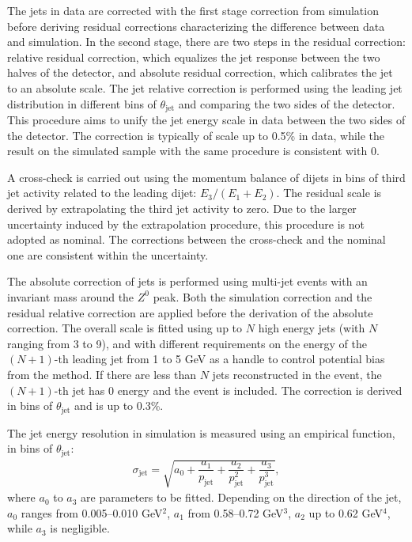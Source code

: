 \documentclass[aps,preprint,superscriptaddress,groupedaddress]{revtex4}  %
\begin{document}
The jets in data are corrected with the first stage correction from simulation before deriving residual corrections characterizing the difference between data and simulation.  In the second stage, there are two steps in the residual correction: relative residual correction, which equalizes the jet response between the two halves of the detector, and absolute residual correction, which calibrates the jet to an absolute scale. The jet relative correction is performed using the leading jet distribution in different bins of $\theta_\text{jet}$ and comparing the two sides of the detector.  This procedure aims to unify the jet energy scale in data between the two sides of the detector.  The correction is typically of scale up to 0.5\% in data, while the result on the simulated sample with the same procedure is consistent with 0.

A cross-check is carried out using the momentum balance of dijets in bins of third jet activity related to the leading dijet: $E_3/(E_1+E_2)$.  The residual scale is derived by extrapolating the third jet activity to zero.  Due to the larger uncertainty induced by the extrapolation procedure, this procedure is not adopted as nominal.   The corrections between the cross-check and the nominal one are consistent within the uncertainty.

The absolute correction of jets is performed using multi-jet events with an invariant mass around the $Z^0$ peak.  Both the simulation correction and the residual relative correction are applied before the derivation of the absolute correction.  The overall scale is fitted using up to $N$ high energy jets (with $N$ ranging from 3 to 9), and with different requirements on the energy of the $(N+1)$-th leading jet from 1 to 5 GeV as a handle to control potential bias from the method.  If there are less than $N$ jets reconstructed in the event, the $(N+1)$-th jet has 0 energy and the event is included.  The correction is derived in bins of $\theta_\text{jet}$ and is up to 0.3\%.

The jet energy resolution in simulation is measured using an empirical function, in bins of $\theta_\text{jet}$:
%
\begin{align}
    \sigma_\text{jet} = \sqrt{a_0 + \dfrac{a_1}{p_\text{jet}} + \dfrac{a_2}{p_\text{jet}^2} + \dfrac{a_3}{p_\text{jet}^3}},\nonumber
\end{align}
%
where $a_0$ to $a_3$ are parameters to be fitted.  Depending on the direction of the jet, $a_0$ ranges from 0.005--0.010 GeV$^2$, $a_1$ from 0.58--0.72 GeV$^3$, $a_2$ up to 0.62 GeV$^4$, while $a_3$ is negligible.
\end{document}
